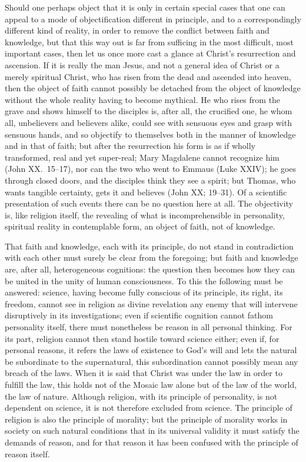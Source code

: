 \documentclass[12pt,a4paper]{article}
\newcommand{\opage}[1]{\marginnote{\footnotesize\textit{[#1]}}}
\begin{document}
Should one perhaps object that it is only in certain special cases that
one can appeal to a mode of objectification different in principle, and
to a correspondingly different kind of reality, in order to remove the
conflict between faith and knowledge, but that this way out is far from
sufficing in the most difficult, most important cases, then let us once
more cast a glance at Christ's resurrection and ascension. If it is
really the man Jesus, and not a general idea of Christ or a merely
spiritual Christ, who has risen from the dead and ascended into heaven,
then the object of faith cannot possibly be detached from the object of
knowledge without the whole reality having to become mythical. He who
rises from the grave and shows himself to the disciples is, after all,
the crucified one, he whom all, unbelievers and believers alike, could
see with sensuous eyes and grasp with sensuous hands, and so objectify to
themselves both in the manner of knowledge and in that of faith; but
after the resurrection his form is as if wholly transformed, real and yet
super-real; Mary Magdalene cannot recognize him (John XX.\ 15--17), nor
can the two who went to Emmaus (Luke XXIV); he goes through closed doors,
and the disciples think they see a spirit; but Thomas, who wants tangible
certainty, gets it and believes (John XX; 19--31). Of a scientific
presentation of such events there can be no question here at all. The
objectivity is, like religion itself, the revealing of what is
incomprehensible in personality, spiritual reality in contemplable form,
an object of faith, not of knowledge.

That faith and knowledge, each with its principle, do not stand in
contradiction with each other must surely be clear from the foregoing;
\opage{54}but faith and knowledge are, after all, heterogeneous cognitions: the
question then becomes how they can be united in the unity of human
consciousness. To this the following must be answered: science, having
become fully conscious of its principle, its right, its freedom, cannot
see in religion as divine revelation any enemy that will intervene
disruptively in its investigations; even if scientific cognition cannot
fathom personality itself, there must nonetheless be reason in all
personal thinking. For its part, religion cannot then stand hostile
toward science either; even if, for personal reasons, it refers the laws
of existence to God's will and lets the natural be subordinate to the
supernatural, this subordination cannot possibly mean any breach of the
laws. When it is said that Christ was under the law in order to fulfill
the law, this holds not of the Mosaic law alone but of the law of the
world, the law of nature. Although religion, with its principle of
personality, is not dependent on science, it is not therefore excluded
from science. The principle of religion is also the principle of
morality; but the principle of morality works in society on such natural
conditions that in its universal validity it must satisfy the demands of
reason, and for that reason it has been confused with the principle of
reason itself.
\end{document}
